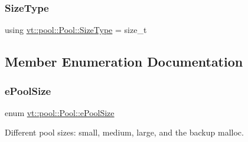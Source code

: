 \mbox{\label{structvt_1_1pool_1_1_pool_a4030898e09d0160c24743a7b949c0d46}} 
\subsubsection{\texorpdfstring{Size\+Type}{SizeType}}
{\footnotesize\ttfamily using \hyperlink{structvt_1_1pool_1_1_pool_a4030898e09d0160c24743a7b949c0d46}{vt\+::pool\+::\+Pool\+::\+Size\+Type} =  size\+\_\+t}



\subsection{Member Enumeration Documentation}
\mbox{\label{structvt_1_1pool_1_1_pool_ace8d36439e5e599a8ee68b2f1a6a6b28}} 
\subsubsection{\texorpdfstring{e\+Pool\+Size}{ePoolSize}}
{\footnotesize\ttfamily enum \hyperlink{structvt_1_1pool_1_1_pool_ace8d36439e5e599a8ee68b2f1a6a6b28}{vt\+::pool\+::\+Pool\+::e\+Pool\+Size}\hspace{0.3cm}{\ttfamily [strong]}}



Different pool sizes\+: small, medium, large, and the backup malloc. 

